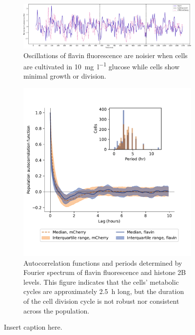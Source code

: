 \begin{figure}
  \centering
  \begin{subfigure}[htpb]{1.0\textwidth}
   \centering
   \includegraphics[width=\textwidth]{limiting_single_birth_plot_edit.pdf}
   \caption{
     Oscillations of flavin fluorescence are noisier when cells are cultivated in \SI{10}{\milli\gram~\litre^{-1}} glucose while cells show minimal growth or division.
   }
   \label{fig:biology-lowglc-single}
  \end{subfigure}

  \begin{subfigure}[htpb]{0.7\textwidth}
   \centering
   \includegraphics[width=\textwidth]{htb2mCherry_31492_12.pdf}
   \caption{
     Autocorrelation functions and periods determined by Fourier spectrum of flavin fluorescence and histone 2B levels.
     This figure indicates that the cells' metabolic cycles are approximately \SI{2.5}{\hour} long, but the duration of the cell division cycle is not robust nor consistent across the population.
   }
   \label{fig:biology-lowglc-acf}
  \end{subfigure}
  \caption{
    Insert caption here.
  }
  \label{fig:biology-lowglc}
\end{figure}



